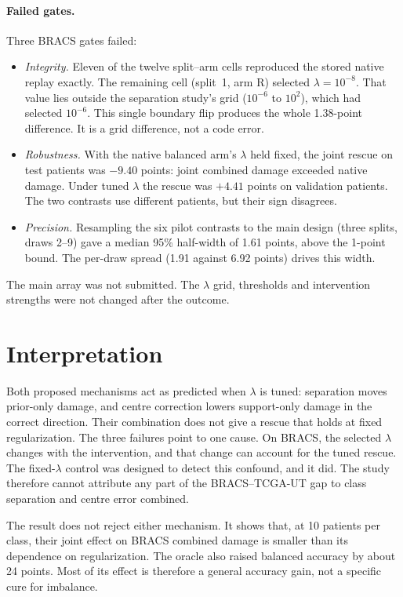 \documentclass[11pt]{article}
\begin{document}
\paragraph{Failed gates.} Three BRACS gates failed:
\begin{itemize}
  \item \emph{Integrity.} Eleven of the twelve split--arm cells reproduced the stored native replay exactly. The remaining cell (split~1, arm R) selected $\lambda = 10^{-8}$. That value lies outside the separation study's grid ($10^{-6}$ to $10^{2}$), which had selected $10^{-6}$. This single boundary flip produces the whole 1.38-point difference. It is a grid difference, not a code error.
  \item \emph{Robustness.} With the native balanced arm's $\lambda$ held fixed, the joint rescue on test patients was $-9.40$ points: joint combined damage exceeded native damage. Under tuned $\lambda$ the rescue was $+4.41$ points on validation patients. The two contrasts use different patients, but their sign disagrees.
  \item \emph{Precision.} Resampling the six pilot contrasts to the main design (three splits, draws 2--9) gave a median 95\% half-width of 1.61 points, above the 1-point bound. The per-draw spread (1.91 against 6.92 points) drives this width.
\end{itemize}
The main array was not submitted. The $\lambda$ grid, thresholds and intervention strengths were not changed after the outcome.

\section{Interpretation}
\label{sec:interpretation}
Both proposed mechanisms act as predicted when $\lambda$ is tuned: separation moves prior-only damage, and centre correction lowers support-only damage in the correct direction. Their combination does not give a rescue that holds at fixed regularization. The three failures point to one cause. On BRACS, the selected $\lambda$ changes with the intervention, and that change can account for the tuned rescue. The fixed-$\lambda$ control was designed to detect this confound, and it did. The study therefore cannot attribute any part of the BRACS--TCGA-UT gap to class separation and centre error combined.

The result does not reject either mechanism. It shows that, at 10 patients per class, their joint effect on BRACS combined damage is smaller than its dependence on regularization. The oracle also raised balanced accuracy by about 24 points. Most of its effect is therefore a general accuracy gain, not a specific cure for imbalance.
\end{document}
